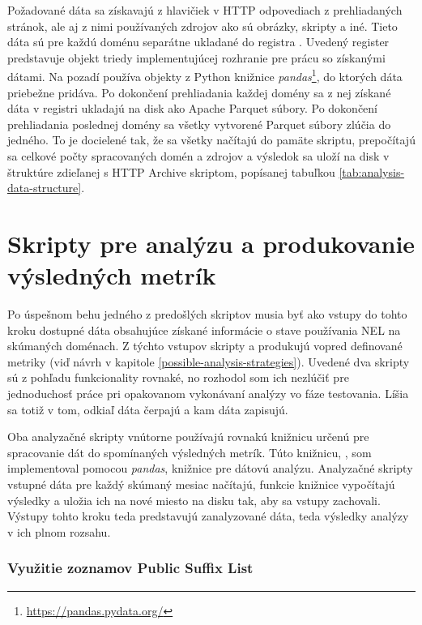 Požadované dáta sa získavajú z hlavičiek v HTTP odpovediach z prehliadaných stránok, ale aj z nimi používaných zdrojov ako sú obrázky, skripty a iné.
Tieto dáta sú pre každú doménu separátne ukladané do registra .
Uvedený register predstavuje objekt triedy implementujúcej rozhranie pre prácu so získanými dátami. 
Na pozadí používa  objekty z Python knižnice \textit{pandas}\footnote{\url{https://pandas.pydata.org/}}, do ktorých dáta priebežne pridáva.
Po dokončení prehliadania každej domény sa z nej získané dáta v registri ukladajú na disk ako Apache Parquet súbory.
Po dokončení prehliadania poslednej domény sa všetky vytvorené Parquet súbory zlúčia do jedného.
To je docielené tak, že sa všetky načítajú do pamäte skriptu, prepočítajú sa celkové počty spracovaných domén a zdrojov a výsledok sa uloží na disk v štruktúre zdieľanej s HTTP Archive skriptom, popísanej tabuľkou \ref{tab:analysis-data-structure}.

\section{Skripty pre analýzu a produkovanie výsledných metrík}
\label{analyze_results}

Po úspešnom behu jedného z predošlých skriptov musia byť ako vstupy do tohto kroku dostupné dáta obsahujúce získané informácie o stave používania NEL na skúmaných doménach.
Z týchto vstupov skripty  a  produkujú vopred definované metriky (viď návrh v kapitole \ref{possible-analysis-strategies}).
Uvedené dva skripty sú z pohľadu funkcionality rovnaké, no rozhodol som ich nezlúčiť pre jednoduchosť práce pri opakovanom vykonávaní analýzy vo fáze testovania.
Líšia sa totiž v tom, odkiaľ dáta čerpajú a kam dáta zapisujú.

Oba analyzačné skripty vnútorne používajú rovnakú knižnicu určenú pre spracovanie dát do spomínaných výsledných metrík.
Túto knižnicu, , som implementoval pomocou \textit{pandas}, knižnice pre dátovú analýzu.
Analyzačné skripty vstupné dáta pre každý skúmaný mesiac načítajú, funkcie knižnice vypočítajú výsledky a uložia ich na nové miesto na disku tak, aby sa vstupy zachovali.
Výstupy tohto kroku teda predstavujú zanalyzované dáta, teda výsledky analýzy v ich plnom rozsahu.

\subsubsection{Využitie zoznamov Public Suffix List}

